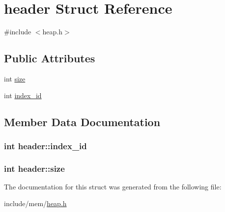 \hypertarget{structheader}{}\section{header Struct Reference}
\label{structheader}


{\ttfamily \#include $<$heap.\+h$>$}

\subsection*{Public Attributes}
\begin{DoxyCompactItemize}
\item 
int \hyperlink{structheader_af8cc659f702446226bc2ebabba437d5d}{size}
\item 
int \hyperlink{structheader_aec42bcd6139d12f84d54b5e6a149b276}{index\+\_\+id}
\end{DoxyCompactItemize}


\subsection{Member Data Documentation}
\hypertarget{structheader_aec42bcd6139d12f84d54b5e6a149b276}{}
\subsubsection[{index\+\_\+id}]{\setlength{\rightskip}{0pt plus 5cm}int header\+::index\+\_\+id}\label{structheader_aec42bcd6139d12f84d54b5e6a149b276}
\hypertarget{structheader_af8cc659f702446226bc2ebabba437d5d}{}
\subsubsection[{size}]{\setlength{\rightskip}{0pt plus 5cm}int header\+::size}\label{structheader_af8cc659f702446226bc2ebabba437d5d}


The documentation for this struct was generated from the following file\+:\begin{DoxyCompactItemize}
\item 
include/mem/\hyperlink{heap_8h}{heap.\+h}\end{DoxyCompactItemize}
